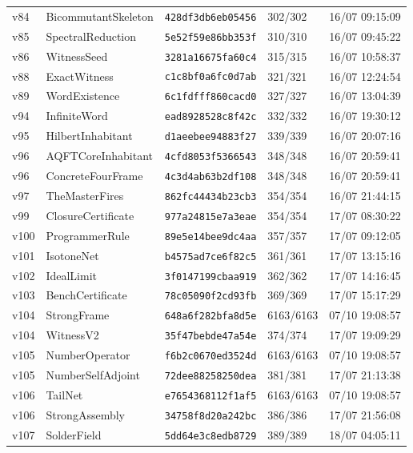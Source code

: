 \documentclass[11pt]{article}
\theoremstyle{definition}\newtheorem{deriv}{Derivação}
\begin{document}
{\begin{longtable}{@{}lllll@{}}
v84 & BicommutantSkeleton & \texttt{428df3db6eb05456} & 302/302 & 16/07 09:15:09 \\
v85 & SpectralReduction & \texttt{5e52f59e86bb353f} & 310/310 & 16/07 09:45:22 \\
v86 & WitnessSeed & \texttt{3281a16675fa60c4} & 315/315 & 16/07 10:58:37 \\
v88 & ExactWitness & \texttt{c1c8bf0a6fc0d7ab} & 321/321 & 16/07 12:24:54 \\
v89 & WordExistence & \texttt{6c1fdfff860cacd0} & 327/327 & 16/07 13:04:39 \\
v94 & InfiniteWord & \texttt{ead8928528c8f42c} & 332/332 & 16/07 19:30:12 \\
v95 & HilbertInhabitant & \texttt{d1aeebee94883f27} & 339/339 & 16/07 20:07:16 \\
v96 & AQFTCoreInhabitant & \texttt{4cfd8053f5366543} & 348/348 & 16/07 20:59:41 \\
v96 & ConcreteFourFrame & \texttt{4c3d4ab63b2df108} & 348/348 & 16/07 20:59:41 \\
v97 & TheMasterFires & \texttt{862fc44434b23cb3} & 354/354 & 16/07 21:44:15 \\
v99 & ClosureCertificate & \texttt{977a24815e7a3eae} & 354/354 & 17/07 08:30:22 \\
v100 & ProgrammerRule & \texttt{89e5e14bee9dc4aa} & 357/357 & 17/07 09:12:05 \\
v101 & IsotoneNet & \texttt{b4575ad7ce6f82c5} & 361/361 & 17/07 13:15:16 \\
v102 & IdealLimit & \texttt{3f0147199cbaa919} & 362/362 & 17/07 14:16:45 \\
v103 & BenchCertificate & \texttt{78c05090f2cd93fb} & 369/369 & 17/07 15:17:29 \\
v104 & StrongFrame & \texttt{648a6f282bfa8d5e} & 6163/6163 & 07/10 19:08:57 \\
v104 & WitnessV2 & \texttt{35f47bebde47a54e} & 374/374 & 17/07 19:09:29 \\
v105 & NumberOperator & \texttt{f6b2c0670ed3524d} & 6163/6163 & 07/10 19:08:57 \\
v105 & NumberSelfAdjoint & \texttt{72dee88258250dea} & 381/381 & 17/07 21:13:38 \\
v106 & TailNet & \texttt{e7654368112f1af5} & 6163/6163 & 07/10 19:08:57 \\
v106 & StrongAssembly & \texttt{34758f8d20a242bc} & 386/386 & 17/07 21:56:08 \\
v107 & SolderField & \texttt{5dd64e3c8edb8729} & 389/389 & 18/07 04:05:11 \\

\end{longtable}}
\end{document}
